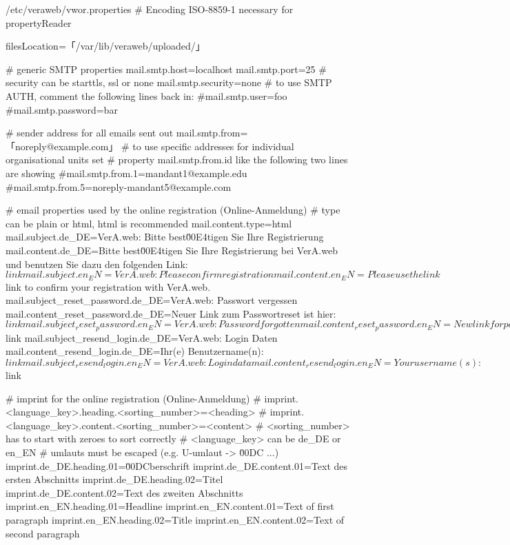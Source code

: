 \documentclass{tarentanleitung}
\begin{document}
\begin{lstdump}{/etc/veraweb/vwor.properties}
# Encoding ISO-8859-1 necessary for propertyReader

filesLocation=「/var/lib/veraweb/uploaded/」

# generic SMTP properties
mail.smtp.host=localhost
mail.smtp.port=25
# security can be starttls, ssl or none
mail.smtp.security=none
# to use SMTP AUTH, comment the following lines back in:
#mail.smtp.user=foo
#mail.smtp.password=bar

# sender address for all emails sent out
mail.smtp.from=「noreply@example.com」
# to use specific addresses for individual organisational units set
# property mail.smtp.from.{id} like the following two lines are showing
#mail.smtp.from.1=mandant1@example.edu
#mail.smtp.from.5=noreply-mandant5@example.com

# email properties used by the online registration (Online-Anmeldung)
# type can be plain or html, html is recommended
mail.content.type=html
mail.subject.de_DE=VerA.web: Bitte best\u00E4tigen Sie Ihre Registrierung
mail.content.de_DE=Bitte best\u00E4tigen Sie Ihre Registrierung bei VerA.web und benutzen Sie dazu den folgenden Link: ${link}
mail.subject.en_EN=VerA.web: Please confirm registration
mail.content.en_EN=Please use the link ${link} to confirm your registration with VerA.web.
mail.subject_reset_password.de_DE=VerA.web: Passwort vergessen
mail.content_reset_password.de_DE=Neuer Link zum Passwortreset ist hier: ${link}
mail.subject_reset_password.en_EN=VerA.web: Password forgotten
mail.content_reset_password.en_EN=New link for password reset is here: ${link}
mail.subject_resend_login.de_DE=VerA.web: Login Daten
mail.content_resend_login.de_DE=Ihr(e) Benutzername(n): ${link}
mail.subject_resend_login.en_EN=VerA.web: Login data
mail.content_resend_login.en_EN=Your username(s): ${link}

# imprint for the online registration (Online-Anmeldung)
# imprint.<language_key>.heading.<sorting_number>=<heading>
# imprint.<language_key>.content.<sorting_number>=<content>
# <sorting_number> has to start with zeroes to sort correctly
# <language_key> can be de_DE or en_EN
# umlauts must be escaped (e.g. U-umlaut -> \u00DC ...)
imprint.de_DE.heading.01=\u00DCberschrift
imprint.de_DE.content.01=Text des ersten Abschnitts
imprint.de_DE.heading.02=Titel
imprint.de_DE.content.02=Text des zweiten Abschnitts
imprint.en_EN.heading.01=Headline
imprint.en_EN.content.01=Text of first paragraph
imprint.en_EN.heading.02=Title
imprint.en_EN.content.02=Text of second paragraph
\end{lstdump}
\end{document}
